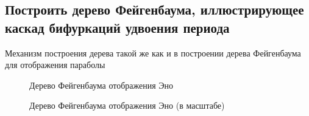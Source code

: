 \documentclass[12pt, a4paper]{article}
\begin{document}
\subsection{Построить дерево Фейгенбаума, иллюстрирующее каскад бифуркаций удвоения периода}
Механизм построения дерева такой же как и в построении дерева Фейгенбаума для отображения параболы
\begin{figure}[H]
	\caption{Дерево Фейгенбаума отображения Эно}
\end{figure}
\begin{figure}[H]
	\caption{Дерево Фейгенбаума отображения Эно (в масштабе)}
\end{figure}
\end{document}
